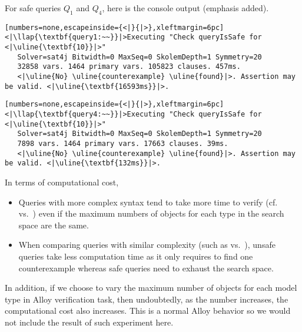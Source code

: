 \noindent
For safe queries $Q_1$ and $Q_4$, here is the console output (emphasis added).

\begin{lstlisting}[numbers=none,escapeinside={<|}{|>},xleftmargin=6pc]
<|\llap{\textbf{query1:~~}}|>Executing "Check queryIsSafe for <|\uline{\textbf{10}}|>"
   Solver=sat4j Bitwidth=0 MaxSeq=0 SkolemDepth=1 Symmetry=20
   32858 vars. 1464 primary vars. 105823 clauses. 457ms.
   <|\uline{No} \uline{counterexample} \uline{found}|>. Assertion may be valid. <|\uline{\textbf{16593ms}}|>.
\end{lstlisting}

\begin{lstlisting}[numbers=none,escapeinside={<|}{|>},xleftmargin=6pc]
<|\llap{\textbf{query4:~~}}|>Executing "Check queryIsSafe for <|\uline{\textbf{10}}|>"
   Solver=sat4j Bitwidth=0 MaxSeq=0 SkolemDepth=1 Symmetry=20
   7898 vars. 1464 primary vars. 17663 clauses. 39ms.
   <|\uline{No} \uline{counterexample} \uline{found}|>. Assertion may be valid. <|\uline{\textbf{132ms}}|>.
\end{lstlisting}

\begin{note}
    In terms of computational cost,
    \begin{itemize}[topsep=0.5pc,itemsep=0.25pc]
        \item  Queries with more complex syntax tend to take more time to verify (cf.\  vs.\ ) even if the maximum numbers of objects for each type in the search space are the same.
        \item  When comparing queries with similar complexity (such as  vs.\ ), unsafe queries take less computation time as it only requires to find one counterexample whereas safe queries need to exhaust the search space.
    \end{itemize}
    In addition, if we choose to vary the maximum number of objects for each model type in Alloy verification task, then undoubtedly, as the number increases, the computational cost also increases. This is a normal Alloy behavior so we would not include the result of such experiment here.
\end{note}
